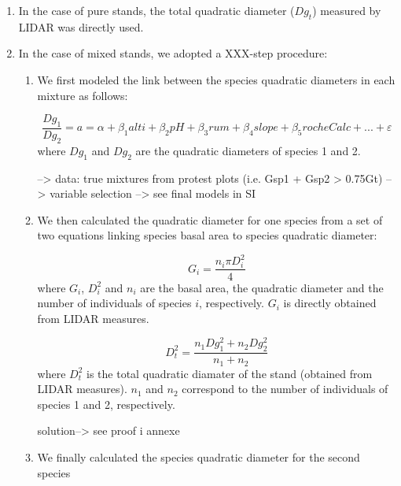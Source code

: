 \documentclass[a4paper]{article}
\begin{document}
\begin{enumerate}
    \item In the case of pure stands, the total quadratic diameter ($Dg_t$) measured by LIDAR was directly used.

    \item In the case of mixed stands, we adopted a XXX-step procedure:
    \begin{enumerate}
        \item We first modeled the link between the species quadratic diameters in each mixture as follows:

            \begin{equation}\label{}
            \frac{Dg_1}{Dg_2} = a = \alpha + \beta_1 alti + \beta_2 pH +\beta_3 rum +\beta_4 slope +\beta_5 rocheCalc+...+\varepsilon
             \end{equation}
           where $Dg_1$ and $Dg_2$ are the quadratic diameters of species 1 and 2.

           --> data: true mixtures from protest plots (i.e. Gsp1 + Gsp2 > 0.75Gt)
           --> variable selection
           --> see final models in SI

        \item We then calculated the quadratic diameter for one species from a set of two equations linking species basal area to species quadratic diameter:

        \begin{equation}\label{}
      G_i = \frac{n_i\pi D_i^2}{4}
        \end{equation}
        where $G_i$, $D_i^2$ and $n_i$ are the basal area, the quadratic diameter and the number of individuals of species $i$, respectively. $G_i$ is directly obtained from LIDAR measures.

        \begin{equation}\label{}
        D_t^2 = \frac{n_1Dg_1^2 + n_2Dg_2^2}{n_1 + n_2}
        \end{equation}
        where $D_t^2$ is the total quadratic diamater of the stand (obtained from LIDAR measures). $n_1$ and $n_2$ correspond to the number of individuals of species 1 and 2, respectively.

\noindent solution--> see proof i annexe

        \item We finally calculated the species quadratic diameter for the second species
    \end{enumerate}
\end{enumerate}
\end{document}
